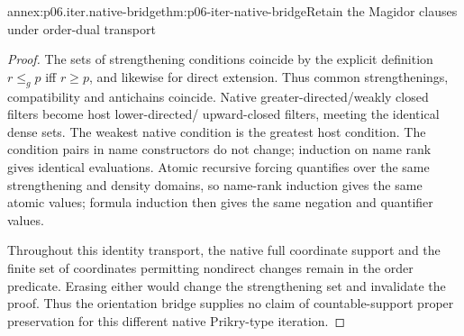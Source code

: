 \begin{annexitem}{annex:p06.iter.native-bridge}{thm:p06-iter-native-bridge}{Retain the Magidor clauses under order-dual transport}
\begin{proof}
The sets of strengthening conditions coincide by the explicit definition
\(r\leq_g p\) iff \(r\geq p\), and likewise for direct extension.
Thus common strengthenings, compatibility and antichains coincide.
Native greater-directed/weakly closed filters become host lower-directed/
upward-closed filters, meeting the identical dense sets. The weakest
native condition is the greatest host condition. The condition pairs
in name constructors do not change; induction on name rank gives
identical evaluations. Atomic recursive forcing quantifies over the
same strengthening and density domains, so name-rank induction gives
the same atomic values; formula induction then gives the same negation
and quantifier values.

Throughout this identity transport, the native full coordinate support
and the finite set of coordinates permitting nondirect changes remain
in the order predicate. Erasing either would change the strengthening
set and invalidate the proof. Thus the orientation bridge supplies
no claim of countable-support proper preservation for this different
native Prikry-type iteration.
\end{proof}
\end{annexitem}
